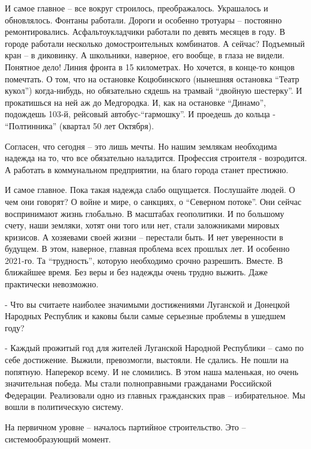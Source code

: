 И самое главное – все вокруг строилось, преображалось. Украшалось и
обновлялось. Фонтаны работали. Дороги и особенно тротуары – постоянно
ремонтировались. Асфальтоукладчики работали по девять месяцев в году. В городе
работали несколько домостроительных комбинатов. А сейчас? Подъемный кран – в
диковинку. А школьники, наверное, его вообще, в глаза не видели. Понятное дело!
Линия фронта в 15 километрах. Но хочется, в конце-то концов помечтать. О том,
что на остановке Коцюбинского (нынешняя остановка \enquote{Театр кукол}) когда-нибудь,
но обязательно сядешь на трамвай \enquote{двойную шестерку}. И прокатишься на ней аж до
Медгородка. И, как на остановке \enquote{Динамо}, подождешь 103-й, рейсовый
автобус-\enquote{гармошку}. И проедешь до кольца - \enquote{Полтинника} (квартал 50 лет
Октября).

Согласен, что сегодня – это лишь мечты. Но нашим землякам необходима надежда на
то, что все обязательно наладится. Профессия строителя - возродится. А работать
в коммунальном предприятии, на благо города станет престижно.

И самое главное. Пока такая надежда слабо ощущается. Послушайте людей. О чем
они говорят? О войне и мире, о санкциях, о \enquote{Северном потоке}. Они сейчас
воспринимают жизнь глобально. В масштабах геополитики. И по большому счету,
наши земляки, хотят они того или нет, стали заложниками мировых кризисов. А
хозяевами своей жизни – перестали быть. И нет уверенности в будущем. В этом,
наверное, главная проблема всех прошлых лет. И особенно 2021-го. Та
\enquote{трудность}, которую необходимо срочно разрешить. Вместе. В ближайшее время.
Без веры и без надежды очень трудно выжить. Даже практически невозможно.

- Что вы считаете наиболее значимыми достижениями Луганской и Донецкой Народных
Республик и каковы были самые серьезные проблемы в ушедшем году?

- Каждый прожитый год для жителей Луганской Народной Республики – само по себе
достижение. Выжили, превозмогли, выстояли. Не сдались. Не пошли на попятную.
Наперекор всему. И не сломились. В этом наша маленькая, но очень значительная
победа. Мы стали полноправными гражданами Российской Федерации. Реализовали
одно из главных гражданских прав – избирательное. Мы вошли в политическую
систему.

На первичном уровне – началось партийное строительство. Это – системообразующий момент.

